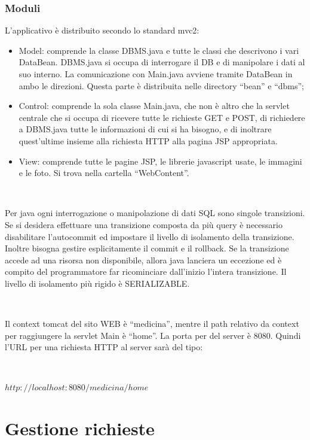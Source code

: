 \documentclass[a4paper,titlepage]{article}
\begin{document}
\section{Moduli}
L'applicativo è distribuito secondo lo standard mvc2:

\begin{itemize}[leftmargin=0.5cm, topsep=0.25cm, itemsep=0.2cm]
\item Model: comprende la classe DBMS.java e tutte le classi che descrivono i vari DataBean. DBMS.java si occupa di interrogare il DB e di manipolare i dati al suo interno. La comunicazione con Main.java avviene tramite DataBean in ambo le direzioni. Questa parte è distribuita nelle directory ``bean'' e ``dbms'';
\item Control: comprende la sola classe Main.java, che non è altro che la servlet centrale che si occupa di ricevere tutte le richieste GET e POST, di richiedere a 
DBMS.java tutte le informazioni di cui si ha bisogno, e di inoltrare quest'ultime insieme alla richiesta HTTP alla pagina JSP appropriata.
\item View: comprende tutte le pagine JSP, le librerie javascript usate, le immagini e le foto. Si trova nella cartella ``WebContent''.

\end{itemize}

~

Per java ogni interrogazione o manipolazione di dati SQL sono singole transizioni. Se si desidera effettuare una transizione composta da più query è necessario disabilitare l'autocommit ed impostare il livello di isolamento della transizione. Inoltre bisogna gestire esplicitamente il commit e il rollback. Se la transizione accede ad una risorsa non disponibile, allora java lanciera un eccezione ed è compito del programmatore far ricominciare dall'inizio l'intera transizione. Il livello di isolamento più rigido è SERIALIZABLE.

~

Il context tomcat del sito WEB è ``medicina'', mentre il path relativo da context per raggiungere la 
servlet Main è ``home''. La porta per del server è 8080. Quindi l'URL per una richiesta HTTP al 
server sarà del tipo:

~

$http://localhost:8080/medicina/home$

\part{Gestione richieste}
\end{document}

